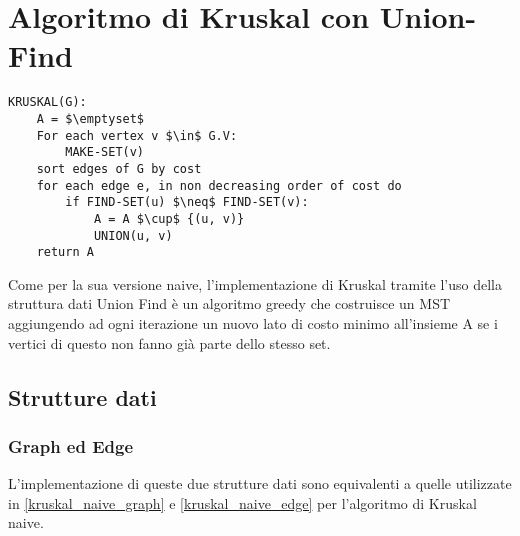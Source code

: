 \section{Algoritmo di Kruskal con Union-Find}\label{kruskal_uf}

\begin{lstlisting}[mathescape=true]
KRUSKAL(G):
	A = $\emptyset$
	For each vertex v $\in$ G.V:
		MAKE-SET(v)
	sort edges of G by cost
	for each edge e, in non decreasing order of cost do	
		if FIND-SET(u) $\neq$ FIND-SET(v):       
			A = A $\cup$ {(u, v)}
			UNION(u, v)
	return A
\end{lstlisting}

Come per la sua versione naive, l'implementazione di Kruskal tramite l'uso della struttura dati Union Find è un algoritmo greedy che costruisce un MST aggiungendo ad ogni iterazione un nuovo lato di costo minimo all'insieme A se i vertici di questo non fanno già parte dello stesso set.

\subsection{Strutture dati}

	\subsubsection{Graph ed Edge}
		L'implementazione di queste due strutture dati sono equivalenti a quelle utilizzate in \ref{kruskal_naive_graph} e \ref{kruskal_naive_edge} per l'algoritmo di Kruskal naive.
	
